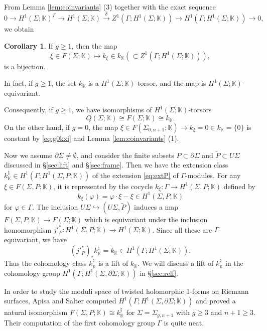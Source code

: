\documentclass[a4paper,12pt, twoside]{amsart}
\theoremstyle{definition}
\newtheorem{cor}[dfn]{Corollary}
\theoremstyle{remark}
\numberwithin{equation}{section}
\newcommand\bK{{\mathbb{K}}}
\newcommand\pa{\partial}
\begin{document}
From Lemma \ref{lem:coinvariants} (3) together with the exact sequence 
$$
0 \to H^1(\Sigma; \bK)^\Gamma \to H^1(\Sigma; \bK) \overset{\delta}\to 
Z^1(\Gamma; H^1(\Sigma; \bK)) \to H^1(\Gamma; H^1(\Sigma; \bK)) \to 0,
$$
we obtain 
\begin{cor}\label{cor:kK} If $g \geq 1$, then the map
$$
\xi \in F(\Sigma; \bK) \mapsto k_\xi \in k_{\bK} \left(\subset Z^1(\Gamma; H^1(\Sigma; \bK)) \right),
$$
is a bijection.
\end{cor}
In fact, if $g \geq 1$, the set $k_{\bK}$ is a $H^1(\Sigma; \bK)$-torsor, and the map is $H^1(\Sigma; \bK)$-equivariant. \par
Consequently, if $g \geq 1$, we have isomorphisms of $H^1(\Sigma; \bK)$-torsors
$$
Q(\Sigma; \bK) \cong F(\Sigma; \bK) \cong k_{\bK}.
$$
On the other hand, if $g=0$, the map $\xi \in F(\Sigma_{0,n+1}; \bK) \to k_\xi = 0 \in k_\bK = \{0\}$ is constant by \eqref{eq:g0kxi} and Lemma \ref{lem:coinvariants} (1). \par

Now we assume $\pa\Sigma\neq \emptyset$, and consider the finite subsets $P \subset \pa\Sigma$ and $\tilde P \subset U\Sigma$ discussed in \S\ref{sec:lift} and \S\ref{sec:frame}. 
Then we have the extension class $k^\natural_\bK \in H^1(\Gamma; H^1(\Sigma, P;\bK))$ of the extension \eqref{eq:extP} of $\Gamma$-modules. 
For any $\xi \in F(\Sigma, P; \bK)$, it is represented by the cocycle $k_\xi: \Gamma \to H^1(\Sigma, P;\bK)$ defined by 
$$
k_\xi(\varphi) = \varphi\cdot \xi - \xi \in H^1(\Sigma, P;\bK)
$$
for $\varphi \in \Gamma$. 
The inclusion $U\Sigma \hookrightarrow (U\Sigma, \tilde P)$ induces a map $F(\Sigma, P; \bK) \to F(\Sigma; \bK)$ which is equivariant under the inclusion homomorphism $j'^*_P: H^1(\Sigma, P;\bK) \to H^1(\Sigma; \bK)$. 
Since all these are $\Gamma$-equivariant, we have 
\begin{equation}\label{eq:natlift}
(j'^*_P)_*k^\natural_\bK = k_\bK \in H^1(\Gamma; H^1(\Sigma; \bK)).
\end{equation}
Thus the cohomology class $k^\natural_\bK$ is a lift of $k_\bK$. 
We will discuss a lift of $k^\natural_\bK$ in the cohomology group $H^1(\Gamma; H^1(\Sigma, \pa\Sigma; \bK))$ in \S\ref{sec:relf}. 
\par
In order to study the moduli space of twisted holomorphic $1$-forms on Riemann surfaces, Apisa and Salter \cite[Theorem A.4]{ApisaSalter} computed $H^1(\Gamma; H^1(\Sigma, \pa\Sigma; \bK))$ and proved a natural isomorphism $F(\Sigma, P; \bK) \cong k^\natural_\bK$ for $\Sigma = \Sigma_{g,n+1}$ with $g \geq 3$ and $n+1 \geq 3$. 
Their computation of the first cohomology group $\Gamma$ is quite neat. 
\par
\end{document}
